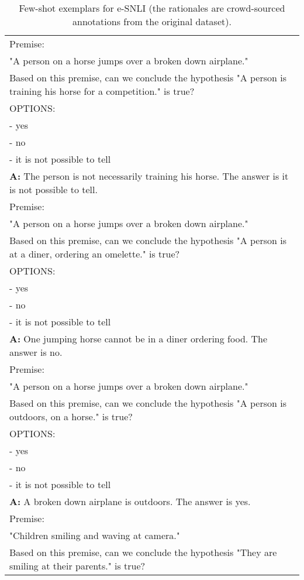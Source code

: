\begin{table}[h]
    \caption{
    Few-shot exemplars for e-SNLI (the rationales are crowd-sourced annotations from the original dataset).
    }
    \centering
    \small
    \begin{tabular}{p{14cm}}
        \toprule
        Premise:\\
"A person on a horse jumps over a broken down airplane."\\
Based on this premise, can we conclude the hypothesis "A person is training his horse for a competition." is true?\\
OPTIONS:\\
- yes\\
- no\\
- it is not possible to tell\\
\textbf{A:} The person is not necessarily training his horse. The answer is it is not possible to tell.\\
\vspace{0mm}
Premise:\\
"A person on a horse jumps over a broken down airplane."\\
Based on this premise, can we conclude the hypothesis "A person is at a diner, ordering an omelette." is true?\\
OPTIONS:\\
- yes\\
- no\\
- it is not possible to tell\\
\textbf{A:} One jumping horse cannot be in a diner ordering food. The answer is no.\\
\vspace{0mm}
Premise:\\
"A person on a horse jumps over a broken down airplane."\\
Based on this premise, can we conclude the hypothesis "A person is outdoors, on a horse." is true?\\
OPTIONS:\\
- yes\\
- no\\
- it is not possible to tell\\
\textbf{A:} A broken down airplane is outdoors. The answer is yes.\\
\vspace{0mm}
Premise:\\
"Children smiling and waving at camera."\\
Based on this premise, can we conclude the hypothesis "They are smiling at their parents." is true?\\

\end{tabular}
\end{table}

